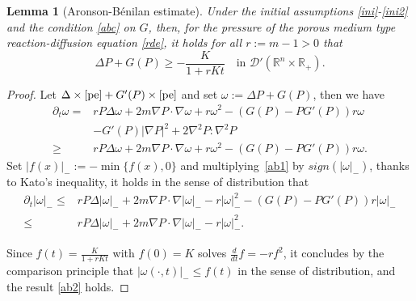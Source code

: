\documentclass[10pt]{article}         %
\newtheorem{lemma}{Lemma}[section]
\numberwithin{equation}{section}
\begin{document}
\begin{lemma}[Aronson-B{\'e}nilan estimate]\label{lAB}
Under the initial assumptions \eqref{ini}-\eqref{ini2} and the condition \eqref{abc} on $G$, then, for the pressure of the porous medium type reaction-diffusion equation \eqref{rde}, it holds for all $r:=m-1>0$ that 
\begin{equation}\label{ab2}
\Delta P+G(P)\geq -\frac{K}{1+rKt}\quad \text{in }\mathcal{D}'(\mathbb{R}^n\times \mathbb{R}_+).
\end{equation}
\end{lemma}
\begin{proof}Let $\Delta \times \eqref{pe}+G'(P)\times\eqref{pe}$ and set $\omega:=\Delta P+G(P)$, then we have
\begin{equation}\label{ab1}
\begin{aligned}
\partial_t \omega=&rP\Delta \omega+2m\nabla P\cdot\nabla \omega+r\omega^2-(G(P)-PG'(P))r\omega\\&-G'(P)|\nabla P|^2+2\nabla^2 P:\nabla^2 P\\
\geq&rP\Delta \omega+2m\nabla P\cdot\nabla \omega+r\omega^2-(G(P)-PG'(P))r\omega.
\end{aligned}
\end{equation}
Set $|f(x)|_-:=-\min\{f(x),0\}$ and  multiplying~\eqref{ab1} by $sign(|\omega|_-)$,  thanks to Kato's inequality,  it holds in the sense of distribution that 
\begin{equation*}
\begin{aligned}
\partial_t |\omega|_-\leq& rP\Delta |\omega|_-+2m\nabla P\cdot\nabla |\omega|_--r|\omega|_-^2-(G(P)-PG'(P))r|\omega|_-\\
\leq & rP\Delta |\omega|_-+2m\nabla P\cdot\nabla |\omega|_--r|\omega|_-^2.
\end{aligned}
\end{equation*}



Since $f(t)=\frac{K}{1+rKt}$ with $f(0)=K$ solves $\frac{d}{dt} f=-rf^2$,  it concludes by the comparison principle that $|\omega(\cdot,t)|_-\leq f(t)$  in the sense of distribution, and the result \eqref{ab2} holds.
\end{proof}
\end{document}
